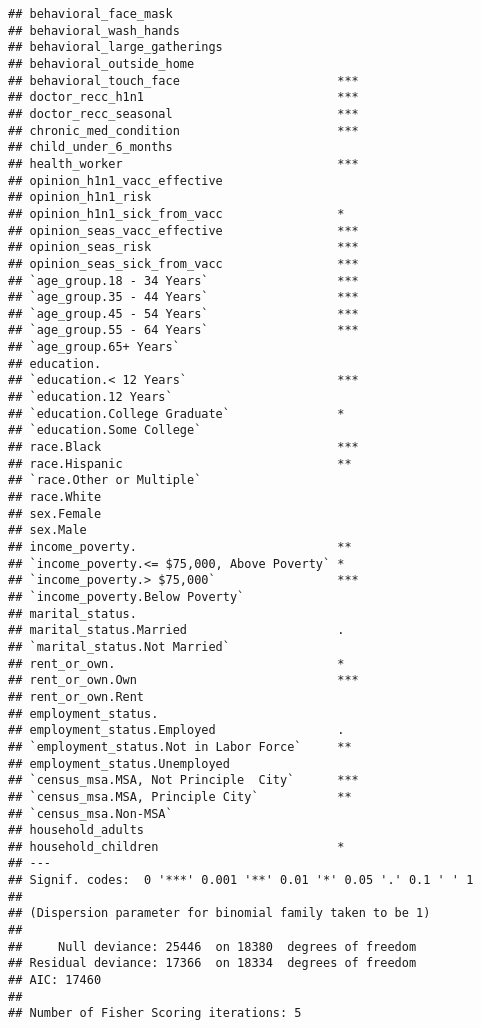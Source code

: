 \documentclass[
]{article}
\begin{document}
\begin{verbatim}
## behavioral_face_mask                          
## behavioral_wash_hands                         
## behavioral_large_gatherings                   
## behavioral_outside_home                       
## behavioral_touch_face                      ***
## doctor_recc_h1n1                           ***
## doctor_recc_seasonal                       ***
## chronic_med_condition                      ***
## child_under_6_months                          
## health_worker                              ***
## opinion_h1n1_vacc_effective                   
## opinion_h1n1_risk                             
## opinion_h1n1_sick_from_vacc                *  
## opinion_seas_vacc_effective                ***
## opinion_seas_risk                          ***
## opinion_seas_sick_from_vacc                ***
## `age_group.18 - 34 Years`                  ***
## `age_group.35 - 44 Years`                  ***
## `age_group.45 - 54 Years`                  ***
## `age_group.55 - 64 Years`                  ***
## `age_group.65+ Years`                         
## education.                                    
## `education.< 12 Years`                     ***
## `education.12 Years`                          
## `education.College Graduate`               *  
## `education.Some College`                      
## race.Black                                 ***
## race.Hispanic                              ** 
## `race.Other or Multiple`                      
## race.White                                    
## sex.Female                                    
## sex.Male                                      
## income_poverty.                            ** 
## `income_poverty.<= $75,000, Above Poverty` *  
## `income_poverty.> $75,000`                 ***
## `income_poverty.Below Poverty`                
## marital_status.                               
## marital_status.Married                     .  
## `marital_status.Not Married`                  
## rent_or_own.                               *  
## rent_or_own.Own                            ***
## rent_or_own.Rent                              
## employment_status.                            
## employment_status.Employed                 .  
## `employment_status.Not in Labor Force`     ** 
## employment_status.Unemployed                  
## `census_msa.MSA, Not Principle  City`      ***
## `census_msa.MSA, Principle City`           ** 
## `census_msa.Non-MSA`                          
## household_adults                              
## household_children                         *  
## ---
## Signif. codes:  0 '***' 0.001 '**' 0.01 '*' 0.05 '.' 0.1 ' ' 1
## 
## (Dispersion parameter for binomial family taken to be 1)
## 
##     Null deviance: 25446  on 18380  degrees of freedom
## Residual deviance: 17366  on 18334  degrees of freedom
## AIC: 17460
## 
## Number of Fisher Scoring iterations: 5
\end{verbatim}
\end{document}
